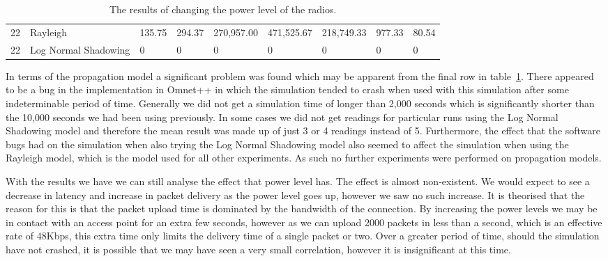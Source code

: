 {\begin{landscape}
\begin{table}
\begin{tabularx}{\linewidth}{|X|X|X|X|X|X|X|X|X|}
                        22 & Rayleigh & 135.75 & 294.37 & 270,957.00 & 471,525.67 & 218,749.33 & 977.33 & 80.54 \\
                        22 & Log Normal Shadowing & 0 & 0 & 0 & 0 & 0 & 0 & 0 \\
                        \hline
                    \end{tabularx}
                    \caption{The results of changing the power level of the radios.}
                    \label{tab:power_level}
                \end{table}
            \end{landscape}
        }


        In terms of the propagation model a significant problem was found which may be apparent from the final row in table~\ref{tab:power_level}. There appeared to be a bug in the implementation in Omnet++ in which the simulation tended to crash when used with this simulation after some indeterminable period of time. Generally we did not get a simulation time of longer than 2,000 seconds which is significantly shorter than the 10,000 seconds we had been using previously. In some cases we did not get readings for particular runs using the Log Normal Shadowing model and therefore the mean result was made up of just 3 or 4 readings instead of 5. Furthermore, the effect that the software bugs had on the simulation when also trying the Log Normal Shadowing model also seemed to affect the simulation when using the Rayleigh model, which is the model used for all other experiments. As such no further experiments were performed on propagation models. 

        With the results we have we can still analyse the effect that power level has. The effect is almost non-existent. We would expect to see a decrease in latency and increase in packet delivery as the power level goes up, however we saw no such increase. It is theorised that the reason for this is that the packet upload time is dominated by the bandwidth of the connection. By increasing the power levels we may be in contact with an access point for an extra few seconds, however as we can upload 2000 packets in less than a second, which is an effective rate of 48Kbps, this extra time only limits the delivery time of a single packet or two. Over a greater period of time, should the simulation have not crashed, it is possible that we may have seen a very small correlation, however it is insignificant at this time. 


